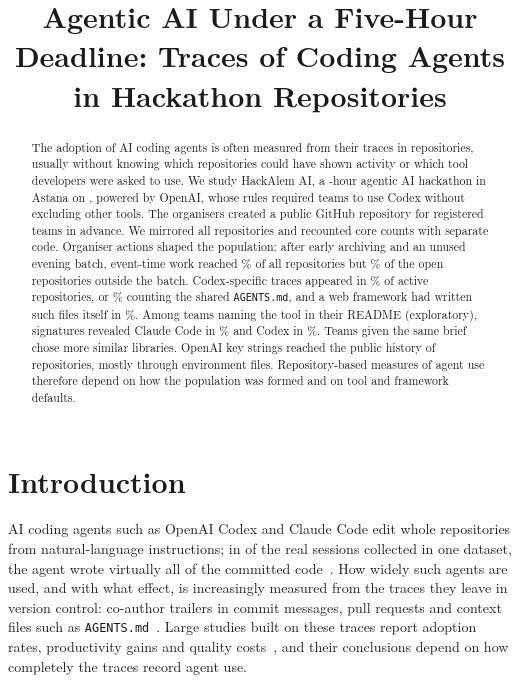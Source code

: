 \documentclass{article}
\title{Agentic AI Under a Five-Hour Deadline: Traces of Coding Agents in \NRqOneTotal{} Hackathon Repositories}
\date{\versiondate}
\author{\authorblock}
\begin{document}
\maketitle

\begin{abstract}
The adoption of AI coding agents is often measured from their traces in repositories, usually without knowing which repositories could have shown activity or which tool developers were asked to use. We study HackAlem AI, a \eventhours-hour agentic AI hackathon in Astana on \eventdate, powered by OpenAI, whose rules required teams to use Codex without excluding other tools. The organisers created a public GitHub repository for registered teams in advance. We mirrored all \NRqOneTotal{} repositories and recounted core counts with separate code. Organiser actions shaped the population: after early archiving and an unused evening batch, event-time work reached \NRqOneActivePct\% of all repositories but \NRqOneActiveOfOpenNonbatchPct\% of the open repositories outside the batch. Codex-specific traces appeared in \NRqTwoTracesCodexSpecificPct\% of active repositories, or \NRqTwoTracesCodexAnyPct\% counting the shared \texttt{AGENTS.md}, and a web framework had written such files itself in \NRqTwoTracesContextExcludedNextjsPct\%. Among teams naming the tool in their README (exploratory), signatures revealed Claude Code in \NRqTwoTracesSelfReportClaudeStrictSignatureGivenMentionPct\% and Codex in \NRqTwoTracesSelfReportCodexStrictSignatureGivenMentionPct\%. Teams given the same brief chose more similar libraries. OpenAI key strings reached the public history of \NRqFourOpenaiN{} repositories, mostly through environment files. Repository-based measures of agent use therefore depend on how the population was formed and on tool and framework defaults.
\end{abstract}

\section{Introduction}\label{sec:intro}

AI coding agents such as OpenAI Codex and Claude Code edit whole repositories from natural-language instructions; in \swechatshare{} of the real sessions collected in one dataset, the agent wrote virtually all of the committed code~\cite{baumann2026swechat}. How widely such agents are used, and with what effect, is increasingly measured from the traces they leave in version control: co-author trailers in commit messages, pull requests and context files such as \texttt{AGENTS.md}~\cite{robbes2026agenticmuch,chatlatanagulchai2025agentreadmes}. Large studies built on these traces report adoption rates, productivity gains and quality costs~\cite{robbes2026agenticmuch,agarwal2026aiides,he2026cursor}, and their conclusions depend on how completely the traces record agent use.
\end{document}
